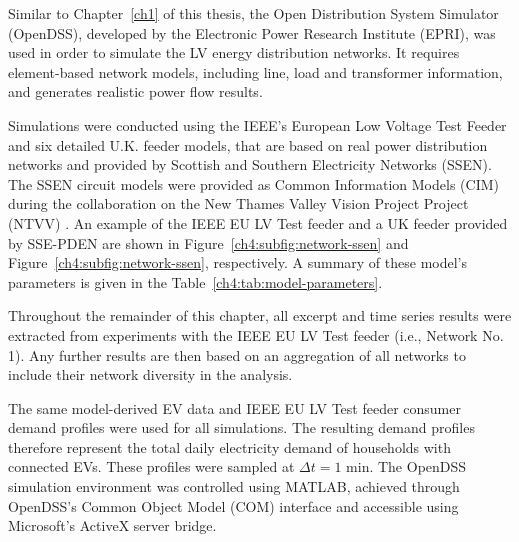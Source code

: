 Similar to Chapter~\ref{ch1} of this thesis, the Open Distribution System Simulator (OpenDSS), developed by the Electronic Power Research Institute (EPRI), was used in order to simulate the LV energy distribution networks.
It requires element-based network models, including line, load and transformer information, and generates realistic power flow results.



Simulations were conducted using the IEEE's European Low Voltage Test Feeder \cite{EULVFeeder2015} and six detailed U.K. feeder models, that are based on real power distribution networks and provided by Scottish and Southern Electricity Networks (SSEN).
The SSEN circuit models were provided as Common Information Models (CIM) during the collaboration on the New Thames Valley Vision Project Project (NTVV) \cite{NTVV2016}.
An example of the IEEE EU LV Test feeder and a UK feeder provided by SSE-PDEN are shown in Figure~\ref{ch4:subfig:network-ssen} and Figure~\ref{ch4:subfig:network-ssen}, respectively.
A summary of these model's parameters is given in the Table~\ref{ch4:tab:model-parameters}.




Throughout the remainder of this chapter, all excerpt and time series results were extracted from experiments with the IEEE EU LV Test feeder (i.e., Network No. 1).
Any further results are then based on an aggregation of all networks to include their network diversity in the analysis.

The same model-derived EV data and IEEE EU LV Test feeder consumer demand profiles were used for all simulations.
The resulting demand profiles therefore represent the total daily electricity demand of households with connected EVs.
These profiles were sampled at $\Delta t = 1\text{ min}$.
The OpenDSS simulation environment was controlled using MATLAB, achieved through OpenDSS's Common Object Model (COM) interface and accessible using Microsoft's ActiveX server bridge.


